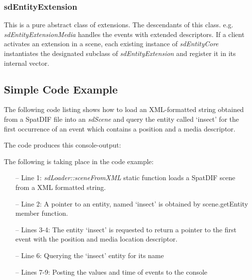 \documentclass[a4paper]{article}
\begin{document}
\subsubsection{sdEntityExtension}
This is a pure abstract class of extensions. The descendants of this class. e.g. {\it sdEntityExtensionMedia} handles the events with extended descriptors. 
If a client activates an extension in a scene, each existing instance of {\it sdEntityCore} instantiates the designated subclass of {\it sdEntityExtension} and register it in its internal vector.

\subsection{Simple Code Example}
The following code listing shows how to load an XML-formatted string obtained from a SpatDIF file into an {\it sdScene} and query the entity called `insect' for the first occurrence of an event which contains a position and a media descriptor.

\vfill

 


\noindent The code produces this console-output: 
 

\noindent 
The following is taking place in the code example:

\begin{itemize}[leftmargin=*]
\item[--] Line 1: {\it sdLoader::sceneFromXML} static function loads a SpatDIF scene from a XML formatted string.
\item[--] Line 2: A pointer to an entity, named `insect' is obtained by scene.getEntity member function.
\item[--] Lines 3-4: The entity `insect' is requested to return a pointer to the first event with the position and media location descriptor.
\item[--] Line 6: Querying the `insect' entity for its name
\item[--] Lines 7-9: Posting the values and time of events to the console
\end{itemize}

\end{document}
